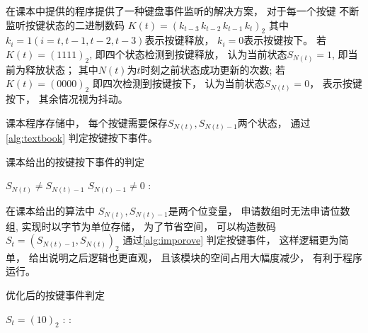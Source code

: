 \documentclass[../main.tex]{subfiles} %
\begin{document}
在课本中提供的程序提供了一种键盘事件监听的解决方案，
对于每一个按键
不断监听按键状态的二进制数码
$K(t) = (k_{t-3}\,  k_{t-2}\, k_{t-1} \,k_t)_2$
其中$k_i = 1(i=t,t-1,t-2,t-3)$表示按键释放，
$k_i = 0$表示按键按下。
若$K(t) = (1111)_2$,
即四个状态检测到按键释放，
认为当前状态$S_{N(t)}=1$,
即当前为释放状态；
其中$N(t)$为$t$时刻之前状态成功更新的次数;
若$K(t) = (0000)_2$
即四次检测到按键按下，
认为当前状态$S_{N(t)} = 0$，
表示按键按下，
其余情况视为抖动。

课本程序存储中，
每个按键需要保存$S_{N(t)},S_{N(t)-1}$两个状态，
通过
\cref{alg:textbook}
判定按键按下事件。

\begin{algorithm}[H]
  \caption{课本给出的按键按下事件的判定}
  \begin{codebox}
      \li \If $S_{N(t)} \neq S_{N(t)-1}$ 
        $S_{N(t)-1} \neq 0$ :
      \Then
        \li \Return {}
      \li \Else
        \li \Return {}
      \End

  \end{codebox}
  \label{alg:textbook}
\end{algorithm}

在课本给出的算法中
$S_{N(t)},S_{N(t)-1}$是两个位变量，
申请数组时无法申请位数组,
实现时以字节为单位存储，
为了节省空间，
可以构造数码$S_t = (S_{N(t)-1}, S_{N(t)})_2$
通过\cref{alg:imporove}
判定按键事件，
这样逻辑更为简单，
给出说明之后逻辑也更直观，
且该模块的空间占用大幅度减少，
有利于程序运行。

\begin{algorithm}[H]
  \caption{优化后的按键事件判定}
  \begin{codebox}
      \li \If $S_t = (10)_2$ :
      \Then
        \li \Return {}
      \li \Else:
        \li \Return {}
      \End
  \end{codebox}
  \label{alg:imporove}
\end{algorithm}
\end{document}
